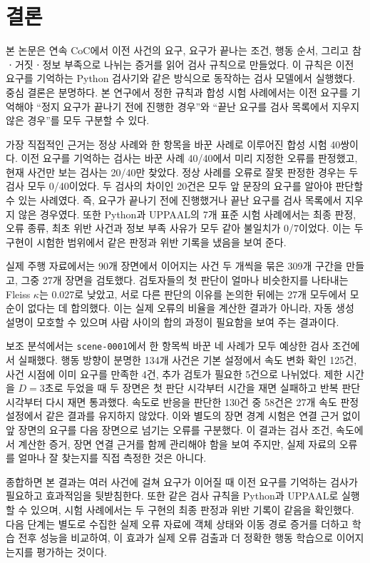 \section{결론}
\label{sec:conclusion}

본 논문은 연속 CoC에서 이전 사건의 요구, 요구가 끝나는 조건, 행동 순서, 그리고 참ㆍ거짓ㆍ정보 부족으로 나뉘는 증거를 읽어 검사 규칙으로 만들었다. 이 규칙은 이전 요구를 기억하는 Python 검사기와 같은 방식으로 동작하는 \uppaal 검사 모델에서 실행했다. 중심 결론은 분명하다. 본 연구에서 정한 규칙과 합성 시험 사례에서는 이전 요구를 기억해야 ``정지 요구가 끝나기 전에 진행한 경우''와 ``끝난 요구를 검사 목록에서 지우지 않은 경우''를 모두 구분할 수 있다.

가장 직접적인 근거는 정상 사례와 한 항목을 바꾼 사례로 이루어진 합성 시험 40쌍이다. 이전 요구를 기억하는 검사는 바꾼 사례 40/40에서 미리 지정한 오류를 판정했고, 현재 사건만 보는 검사는 20/40만 찾았다. 정상 사례를 오류로 잘못 판정한 경우는 두 검사 모두 0/40이었다. 두 검사의 차이인 20건은 모두 앞 문장의 요구를 알아야 판단할 수 있는 사례였다. 즉, 요구가 끝나기 전에 진행했거나 끝난 요구를 검사 목록에서 지우지 않은 경우였다. 또한 Python과 UPPAAL의 7개 표준 시험 사례에서는 최종 판정, 오류 종류, 최초 위반 사건과 정보 부족 사유가 모두 같아 불일치가 0/7이었다. 이는 두 구현이 시험한 범위에서 같은 판정과 위반 기록을 냈음을 보여 준다.

실제 주행 자료에서는 90개 장면에서 이어지는 사건 두 개씩을 묶은 309개 구간을 만들고, 그중 27개 장면을 검토했다. 검토자들의 첫 판단이 얼마나 비슷한지를 나타내는 Fleiss $\kappa$는 0.027로 낮았고, 서로 다른 판단의 이유를 논의한 뒤에는 27개 모두에서 모순이 없다는 데 합의했다. 이는 실제 오류의 비율을 계산한 결과가 아니라, 자동 생성 설명이 모호할 수 있으며 사람 사이의 합의 과정이 필요함을 보여 주는 결과이다.

보조 분석에서는 \texttt{scene-0001}에서 한 항목씩 바꾼 네 사례가 모두 예상한 검사 조건에서 실패했다. 행동 방향이 분명한 134개 사건은 기본 설정에서 속도 변화 확인 125건, 사건 시점에 이미 요구를 만족한 4건, 추가 검토가 필요한 5건으로 나뉘었다. 제한 시간을 $D=3$초로 두었을 때 두 장면은 첫 판단 시각부터 시간을 재면 실패하고 반복 판단 시각부터 다시 재면 통과했다. 속도로 반응을 판단한 130건 중 58건은 27개 속도 판정 설정에서 같은 결과를 유지하지 않았다. 이와 별도의 장면 경계 시험은 연결 근거 없이 앞 장면의 요구를 다음 장면으로 넘기는 오류를 구분했다. 이 결과는 검사 조건, 속도에서 계산한 증거, 장면 연결 근거를 함께 관리해야 함을 보여 주지만, 실제 자료의 오류를 얼마나 잘 찾는지를 직접 측정한 것은 아니다.

종합하면 본 결과는 여러 사건에 걸쳐 요구가 이어질 때 이전 요구를 기억하는 검사가 필요하고 효과적임을 뒷받침한다. 또한 같은 검사 규칙을 Python과 UPPAAL로 실행할 수 있으며, 시험 사례에서는 두 구현의 최종 판정과 위반 기록이 같음을 확인했다. 다음 단계는 별도로 수집한 실제 오류 자료에 객체 상태와 이동 경로 증거를 더하고 학습 전후 성능을 비교하여, 이 효과가 실제 오류 검출과 더 정확한 행동 학습으로 이어지는지를 평가하는 것이다.
